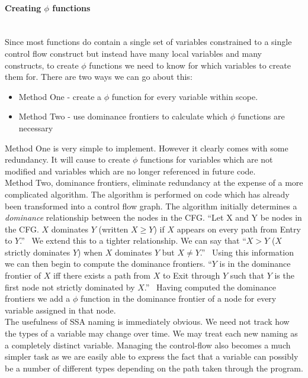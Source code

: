 \documentclass[12pt, titlepage]{article}
\begin{document}
\paragraph*{Creating $\phi$ functions}\mbox{} \\
Since most functions do contain a single set of variables constrained to a single control flow construct but instead have many local variables and many constructs, to create $\phi$ functions we need to know for which variables to create them for. There are two ways we can go about this:
\begin{itemize}
	\item Method One - create a $\phi$ function for every variable within scope.
	\item Method Two - use dominance frontiers to calculate which $\phi$ functions are necessary
\end{itemize}
Method One is very simple to implement. However it clearly comes with some redundancy. It will cause to create $\phi$ functions for variables which are not modified and variables which are no longer referenced in future code. \\
\indent Method Two, dominance frontiers, eliminate redundancy at the expense of a more complicated algorithm. The algorithm is performed on code which has already been transformed into a control flow graph. The algorithm initially determines a \textit{dominance} relationship between the nodes in the CFG. ``Let X and Y be nodes in the CFG. $X$ dominates $Y$ (written $X≥Y$) if $X$ appears on every path from Entry to $Y$.''~\cite{ssaLecture} We extend this to a tighter relationship. We can say that ``$X>Y$ ($X$ strictly dominates $Y$) when $X$ dominates $Y$ but $X \neq Y$.''~\cite{ssaLecture} Using this information we can then begin to compute the dominance frontiers. ``$Y$ is in the dominance frontier of $X$ iff there exists a path from $X$ to Exit through $Y$ such that $Y$ is the first node not strictly dominated by $X$.''~\cite{ssaLecture} Having computed the dominance frontiers we add a $\phi$ function in the dominance frontier of a node for every variable assigned in that node. \\

The usefulness of SSA naming is immediately obvious. We need not track how the types of a variable may change over time. We may treat each new naming as a completely distinct variable. Managing the control-flow also becomes a much simpler task as we are easily able to express the fact that a variable can possibly be a number of different types depending on the path taken through the program.
\end{document}
